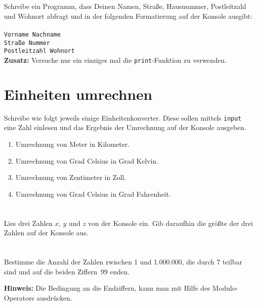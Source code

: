 \documentclass[a4paper]{article}
\begin{document}




\section{}
Schreibe ein Programm, dass Deinen Namen, Straße, Hausnummer, Postleitzahl und Wohnort abfragt und in der folgenden Formatierung auf der Konsole ausgibt:\\ \\
\texttt{Vorname Nachname}\\
\texttt{Straße Nummer}\\
\texttt{Postleitzahl Wohnort}\\

\vspace{2pt}
{\footnotesize\textbf{Zusatz:}
Versuche nur ein einziges mal die \texttt{print}-Funktion zu verwenden.  
}  



\section{Einheiten umrechnen}
Schreibe wie folgt jeweils einige Einheitenkonverter. Diese sollen mittels \texttt{input} eine Zahl einlesen und das Ergebnis der Umrechnung auf der Konsole ausgeben. 
\begin{enumerate}
\item Umrechnung von Meter in Kilometer.
\item Umrechnung von Grad Celsius in Grad Kelvin.
\item Umrechnung von Zentimeter in Zoll.
\item Umrechnung von Grad Celsius in Grad Fahrenheit.
\end{enumerate}

\section{}
Lies drei Zahlen $x$, $y$ und $z$ von der Konsole ein. Gib daraufhin die größte der drei Zahlen auf der Konsole aus. 

\section{}
Bestimme die Anzahl der Zahlen zwischen 1 und 1.000.000, die durch 7 teilbar sind und auf die beiden Ziffern~99 enden.
\vspace{2pt}

{\footnotesize\textbf{Hinweis:}
Die Bedingung an die Endziffern, kann man mit Hilfe des Modulo-Operators ausdrücken. 
 }  
\end{document}
